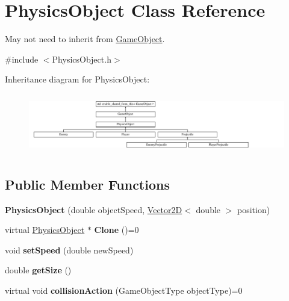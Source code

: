 \hypertarget{class_physics_object}{}\section{Physics\+Object Class Reference}
\label{class_physics_object}


May not need to inherit from \hyperlink{class_game_object}{Game\+Object}.  




{\ttfamily \#include $<$Physics\+Object.\+h$>$}

Inheritance diagram for Physics\+Object\+:\begin{figure}[H]
\begin{center}
\leavevmode
\includegraphics[height=2.695548cm]{d6/db5/class_physics_object}
\end{center}
\end{figure}
\subsection*{Public Member Functions}
\begin{DoxyCompactItemize}
\item 
\mbox{\label{class_physics_object_a7307a6ac792f79c61950d2374ac4c8be}} 
{\bfseries Physics\+Object} (double object\+Speed, \hyperlink{class_vector2_d}{Vector2D}$<$ double $>$ position)
\item 
\mbox{\label{class_physics_object_ae2731efbba254476cb8447226ab4f6b9}} 
virtual \hyperlink{class_physics_object}{Physics\+Object} $\ast$ {\bfseries Clone} ()=0
\item 
\mbox{\label{class_physics_object_ac228aff566334e195f9c68d1e0cfb1bf}} 
void {\bfseries set\+Speed} (double new\+Speed)
\item 
\mbox{\label{class_physics_object_a73f26275a7b7a9234c49d421dfbe1178}} 
double {\bfseries get\+Size} ()
\item 
\mbox{\label{class_physics_object_a1d30c43515d263abd4ae98907aa20b0d}} 
virtual void {\bfseries collision\+Action} (Game\+Object\+Type object\+Type)=0
\end{DoxyCompactItemize}
